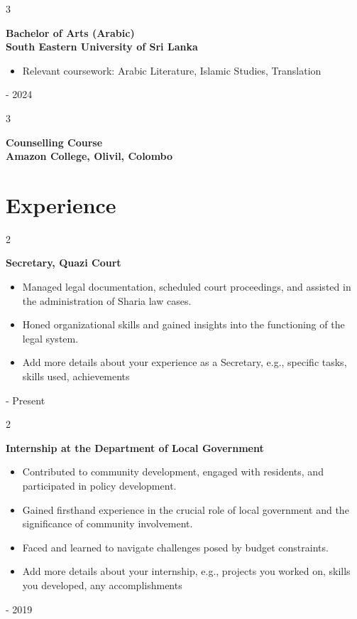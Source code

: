 \documentclass[10pt, letterpaper]{article}
\newenvironment{highlights}{
    \begin{itemize}[
        topsep=0.10 cm,
        parsep=0.10 cm,
        partopsep=0pt,
        itemsep=0pt,
        leftmargin=0.4 cm + 10pt
    ]
}{
    \end{itemize}
} %
\newenvironment{twocolentry}[2][]{
    \onecolentry
    \def\secondColumn{#2}
    \setcolumnwidth{\fill, 4.5 cm}
    \begin{paracol}{2}
    }{
    \switchcolumn \raggedleft \secondColumn
    \end{paracol}
    \endonecolentry
} %
\newenvironment{threecolentry}[3][]{
    \onecolentry
    \def\thirdColumn{#3}
    \setcolumnwidth{0 cm, \fill, 4.5 cm}
    \begin{paracol}{3}
    {\raggedright #2} \switchcolumn
    }{
    \switchcolumn \raggedleft \thirdColumn
    \end{paracol}
    \endonecolentry
} %
\begin{document}
        \begin{threecolentry}{\textbf{}}{
            2019 - 2024
        }
            \textbf{Bachelor of Arts (Arabic)\\South Eastern University of Sri Lanka}
            \begin{highlights}
                \item Relevant coursework: Arabic Literature, Islamic Studies, Translation 
            \end{highlights}
        \end{threecolentry}


        \vspace{0.2 cm}

        \begin{threecolentry}{\textbf{}}{
            2020
        }
            \textbf{Counselling Course\\Amazon College, Olivil, Colombo}
            \begin{highlights}
            \end{highlights}
        \end{threecolentry}



    
\section{Experience}

\begin{twocolentry}{
    2023 - Present
}
    \textbf{Secretary, Quazi Court}
    \begin{highlights}
        \item Managed legal documentation, scheduled court proceedings, and assisted in the administration of Sharia law cases.
        \item Honed organizational skills and gained insights into the functioning of the legal system.
        \item  [Add more details about your experience as a Secretary, e.g., specific tasks, skills used, achievements]
    \end{highlights}
\end{twocolentry}

\vspace{0.2 cm}

\begin{twocolentry}{
    2018 - 2019
}
    \textbf{Internship at the Department of Local Government}
    \begin{highlights}
        \item Contributed to community development, engaged with residents, and participated in policy development.
        \item Gained firsthand experience in the crucial role of local government and the significance of community involvement.
        \item Faced and learned to navigate challenges posed by budget constraints.
        \item  [Add more details about your internship, e.g., projects you worked on, skills you developed, any accomplishments]
    \end{highlights}
\end{twocolentry}
\end{document}
